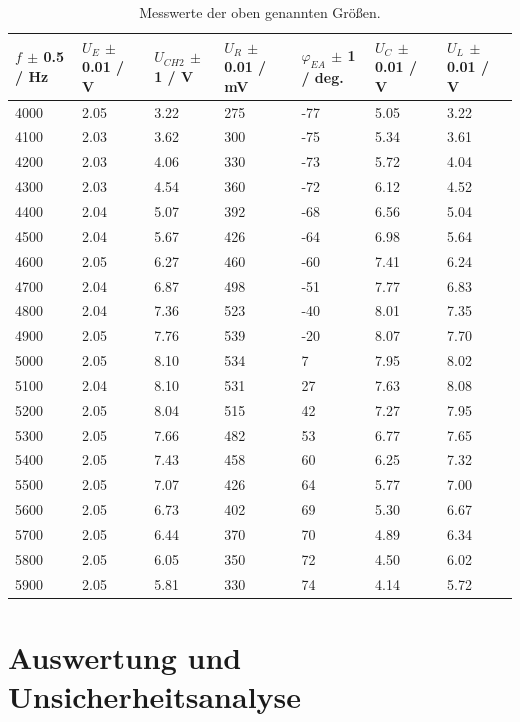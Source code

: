 \documentclass[12pt,a4paper,twoside]{article}
\begin{document}
\begin{table}[H]
    \centering
    \caption{Messwerte der oben genannten Größen. }
    \label{tab:mess4}
    \begin{tabular}{| l | l | l | l | l | l | l |}
        \hline
        $f$ $\pm$ 0.5 / Hz   & $U_E$ $\pm$ 0.01 / V   & $U_{CH2}$ $\pm$ 1 / V & $U_R$ $\pm$ 0.01 / mV  & $\varphi_{EA}$ $\pm$ 1 / deg. & $U_C$ $\pm$ 0.01 / V & $U_L$ $\pm$ 0.01 / V  \\
        \hline
        4000 & 2.05 & 3.22 & 275 & -77 & 5.05 & 3.22 \\
        4100 & 2.03 & 3.62 & 300 & -75 & 5.34 & 3.61 \\
        4200 & 2.03 & 4.06 & 330 & -73 & 5.72 & 4.04 \\
        4300 & 2.03 & 4.54 & 360 & -72 & 6.12 & 4.52 \\
        4400 & 2.04 & 5.07 & 392 & -68 & 6.56 & 5.04 \\
        4500 & 2.04 & 5.67 & 426 & -64 & 6.98 & 5.64 \\
        4600 & 2.05 & 6.27 & 460 & -60 & 7.41 & 6.24 \\
        4700 & 2.04 & 6.87 & 498 & -51 & 7.77 & 6.83 \\
        4800 & 2.04 & 7.36 & 523 & -40 & 8.01 & 7.35 \\
        4900 & 2.05 & 7.76 & 539 & -20 & 8.07 & 7.70 \\
        5000 & 2.05 & 8.10 & 534 &   7 & 7.95 & 8.02 \\
        5100 & 2.04 & 8.10 & 531 &  27 & 7.63 & 8.08 \\
        5200 & 2.05 & 8.04 & 515 &  42 & 7.27 & 7.95 \\
        5300 & 2.05 & 7.66 & 482 &  53 & 6.77 & 7.65 \\
        5400 & 2.05 & 7.43 & 458 &  60 & 6.25 & 7.32 \\
        5500 & 2.05 & 7.07 & 426 &  64 & 5.77 & 7.00 \\
        5600 & 2.05 & 6.73 & 402 &  69 & 5.30 & 6.67 \\
        5700 & 2.05 & 6.44 & 370 &  70 & 4.89 & 6.34 \\
        5800 & 2.05 & 6.05 & 350 &  72 & 4.50 & 6.02 \\
        5900 & 2.05 & 5.81 & 330 &  74 & 4.14 & 5.72 \\
        \hline
    \end{tabular}
\end{table}

\section{Auswertung und Unsicherheitsanalyse} %
\end{document}
